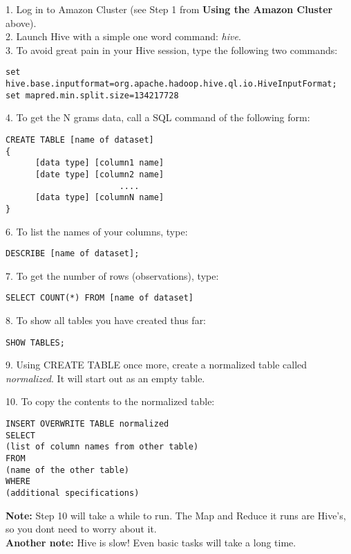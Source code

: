 \documentclass[12pt]{article}
\begin{document}
1. Log in to Amazon Cluster (see Step 1 from {\bf Using the Amazon Cluster} above). \\

2. Launch Hive with a simple one word command: \emph{hive}. \\

3. To avoid great pain in your Hive session, type the following two commands: 
\begin{verbatim}
set hive.base.inputformat=org.apache.hadoop.hive.ql.io.HiveInputFormat; 
set mapred.min.split.size=134217728
\end{verbatim}
\vspace{4 mm}

4. To get the N grams data, call a SQL command of the following form: \\
\begin{verbatim}
CREATE TABLE [name of dataset] 
{
      [data type] [column1 name]
      [date type] [column2 name]
		               ....
      [data type] [columnN name] 
}
\end{verbatim}
\vspace{4 mm}

6. To list the names of your columns, type: 
\begin{verbatim}
DESCRIBE [name of dataset]; 
\end{verbatim}
\vspace{4 mm}

7. To get the number of rows (observations), type: 
\begin{verbatim}
SELECT COUNT(*) FROM [name of dataset]
\end{verbatim}
\vspace{4 mm}

8. To show all tables you have created thus far: 
\begin{verbatim}
SHOW TABLES;
\end{verbatim}
\vspace{4 mm}

9. Using CREATE TABLE once more, create a normalized table called \emph{normalized}. It will start out as an empty table. 
\newpage

10. To copy the contents to the normalized table:
\begin{verbatim}
INSERT OVERWRITE TABLE normalized
SELECT
(list of column names from other table)
FROM
(name of the other table)
WHERE
(additional specifications)
\end{verbatim}
\vspace{4 mm}

{\bf Note:} Step 10 will take a while to run. The Map and Reduce it runs are Hive's, so you dont need to worry about it. \\

{\bf Another note:} Hive is slow! Even basic tasks will take a long time. \\
\end{document}

